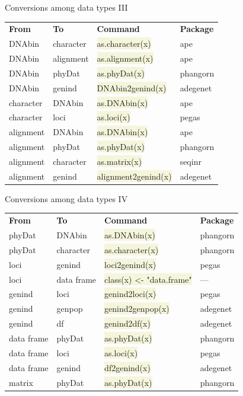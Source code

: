 \documentclass[compress, ucs, xelatex, 11pt, xcolor=svgnames, aspectratio=169,
	hyperref={
		bookmarks=true,
		unicode=true,
		colorlinks=true,
		pdftitle={Molecular data in R},
		plainpages=false,
		pdfauthor={Vojtech Zeisek},
		pdfsubject={Course about phylogeny and evolution in R},
		pdfcreator={XeLaTeX},
		pdfkeywords={R, evolution, phylogeny, molecular data},
		linkcolor=Crimson, %
		anchorcolor=Magenta, %
		citecolor=Magenta, %
		filecolor=Magenta, %
		menucolor=Magenta, %
		urlcolor=DodgerBlue, %
		pdftex},
	url={hyphens, lowtilde} %
	]{beamer}
\renewcommand{\texttt}[1]{\colorbox{Beige}{{\ttfamily #1}}}
\begin{document}
\begin{frame}{Conversions among data types III}
	\begin{tabular}{llll}
		\textbf{From} & \textbf{To} & \textbf{Command} & \textbf{Package}\\
		DNAbin & character & \texttt{as.character(x)} & ape\\
		DNAbin & alignment & \texttt{as.alignment(x)} & ape\\
		DNAbin & phyDat & \texttt{as.phyDat(x)} & phangorn\\
		DNAbin & genind & \texttt{DNAbin2genind(x)} & adegenet\\
		character & DNAbin & \texttt{as.DNAbin(x)} & ape\\
		character & loci & \texttt{as.loci(x)} & pegas\\
		alignment & DNAbin & \texttt{as.DNAbin(x)} & ape\\
		alignment & phyDat & \texttt{as.phyDat(x)} & phangorn\\
		alignment & character & \texttt{as.matrix(x)} & seqinr\\
		alignment & genind & \texttt{alignment2genind(x)} & adegenet
	\end{tabular}
\end{frame}

\begin{frame}{Conversions among data types IV}
	\begin{tabular}{llll}
		\textbf{From} & \textbf{To} & \textbf{Command} & \textbf{Package}\\
		phyDat & DNAbin & \texttt{as.DNAbin(x)} & phangorn\\
		phyDat & character & \texttt{as.character(x)} & phangorn\\
		loci & genind & \texttt{loci2genind(x)} & pegas\\
		loci & data frame & \texttt{class(x) <- "data.frame"} & --- \\
		genind & loci & \texttt{genind2loci(x)} & pegas\\
		genind & genpop & \texttt{genind2genpop(x)} & adegenet\\
		genind & df & \texttt{genind2df(x)} & adegenet\\
		data frame & phyDat & \texttt{as.phyDat(x)} & phangorn\\
		data frame & loci & \texttt{as.loci(x)} & pegas\\
		data frame & genind & \texttt{df2genind(x)} & adegenet\\
		matrix & phyDat & \texttt{as.phyDat(x)} & phangorn
	\end{tabular}
\end{frame}
\end{document}
